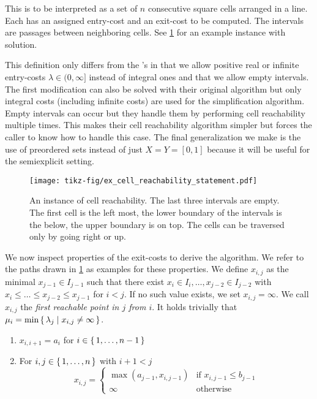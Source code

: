 This is to be interpreted as a set of \(n\) consecutive square cells arranged in a line. Each has an assigned entry-cost and an exit-cost to be computed. The intervals are passages between neighboring cells. See \cref{fig:ex_cell_reachability_statement} for an example instance with solution.

This definition only differs from the \citeauthor{polyline_simplification_has_cubic_complexity_bringmannetal}'s in that we allow positive real or infinite entry-costs \(\lambda \in (0, \infty]\) instead of integral ones and that we allow empty intervals. The first modification can also be solved with their original algorithm but only integral costs (including infinite costs) are used for the simplification algorithm. Empty intervals can occur but they handle them by performing cell reachability multiple times.  This makes their cell reachability algorithm simpler but forces the caller to know how to handle this case. The final generalization we make is the use of preordered sets instead of just \(X = Y = [0, 1]\) because it will be useful for the semiexplicit setting. 

\begin{figure}[htb]
  \centering
  \texttt{[image: tikz-fig/ex\_cell\_reachability\_statement.pdf]}
  \caption{An instance of cell reachability. The last three intervals are empty. The first cell is the left most, the lower boundary of the intervals is the below, the upper boundary is on top. The cells can be traversed only by going right or up.}
  \label{fig:ex_cell_reachability_statement}
\end{figure}

We now inspect properties of the exit-costs to derive the algorithm. We refer to the paths drawn in \cref{fig:ex_cell_reachability_statement} as examples for these properties. We define \(x_{i, j}\) as the minimal \(x_{j-1} \in I_{j-1}\) such that there exist \(x_i \in I_i, \dots, x_{j-2} \in I_{j-2}\) with \(x_i \leq \dots \leq x_{j-2} \leq x_{j-1}\) for \(i < j\). If no such value exists, we set \(x_{i, j} = \infty\). We call \(x_{i,j}\) the \emph{first reachable point in \(j\) from \(i\)}. It holds trivially that \(\mu_i = \min \set{\lambda_j \mid x_{i, j} \neq \infty}\).

\begin{observation}\label{obs:recursive_x}
  \begin{enumerate}
		\item \(x_{i, i+1} = a_i\) for \(i \in \set{1, \dots, n - 1}\) 
		\item For \(i, j \in \set{1, \dots, n}\) with \(i + 1 < j\)
			\[x_{i, j} = 
			\begin{cases}
				\max(a_{j-1}, x_{i, j - 1}) & \textrm{if } x_{i, j-1} \leq b_{j-1}\\
				\infty &\textrm{otherwise}
			\end{cases}\]
  \end{enumerate}
\end{observation}

